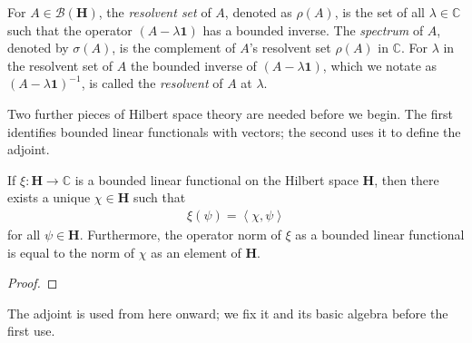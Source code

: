 \begin{definition}
    \label{def:bounded-operator-resolvent-and-spectrum}
    \leanok
    For $A \in \mathcal{B}(\mathbf{H})$, the \textit{resolvent set} of $A$, denoted as $\rho(A)$, is the set of all $\lambda \in \mathbb{C}$ such that the operator $(A - \lambda \mathbf{1})$ has a bounded inverse. The \textit{spectrum} of $A$, denoted by $\sigma(A)$, is the complement of $A$'s resolvent set $\rho(A)$ in $\mathbb{C}$. For $\lambda$ in the resolvent set of $A$ the bounded inverse of $(A - \lambda \mathbf{1})$, which we notate as $(A - \lambda \mathbf{1})^{-1}$, is called the \textit{resolvent} of $A$ at $\lambda$.
\end{definition}

Two further pieces of Hilbert space theory are needed before we begin. The first identifies bounded linear functionals with vectors; the second uses it to define the adjoint.

\begin{theorem}
    \label{thrm:hall-a.52}
    \leanok
    If $\xi : \mathbf{H} \rightarrow \mathbb{C}$ is a bounded linear functional on the Hilbert space $\mathbf{H}$, then there exists a unique $\chi \in \mathbf{H}$ such that
    \begin{align}
        \xi(\psi) = \left< \chi, \psi \right>
    \end{align}
    for all $\psi \in \mathbf{H}$. Furthermore, the operator norm of $\xi$ as a bounded linear functional is equal to the norm of $\chi$ as an element of $\mathbf{H}$.
\end{theorem}
\begin{proof}
\leanok
\end{proof}

The adjoint is used from here onward; we fix it and its basic algebra before the first use.

